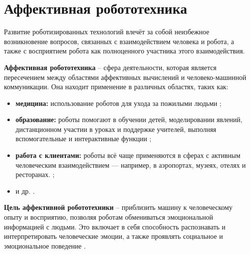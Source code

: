 \chapter{Аффективная робототехника}

Развитие роботизированных технологий влечёт за собой неизбежное возникновение вопросов, связанных с взаимодействием человека и робота, а также с восприятием робота как полноценного участника этого взаимодействия.


\textbf{Аффективная робототехника} -- сфера деятельности, которая является пересечением между областями аффективных вычислений и человеко-машинной коммуникации. Она находит применение в различных областях, таких как: 

\begin{itemize}
	\item \textbf{медицина:} использование роботов для ухода за пожилыми людьми \cite{affect-rob-in-med, affect-rob-in-med-2};
	
	\item \textbf{образование:} роботы помогают в обучении детей, моделировании явлений, дистанционном участии в уроках и поддержке учителей, выполняя вспомогательные и интерактивные функции \cite{affect-rob-in-edu};
	
	\item \textbf{работа с клиентами:} роботы всё чаще применяются в сферах с активным человеческим взаимодействием — например, в аэропортах, музеях, отелях и ресторанах. \cite{affect-rob-in-serv};
	
	\item и др. \cite{affect-rob-in-other-fields}.
\end{itemize}


\textbf{Цель аффективной робототехники} -- приблизить машину к человеческому опыту и восприятию, позволяя роботам обмениваться эмоциональной информацией с людьми. Это включает в себя способность распознавать и интерпретировать человеческие эмоции, а также проявлять социальное и эмоциональное поведение \cite{affect-rob-goal}.


